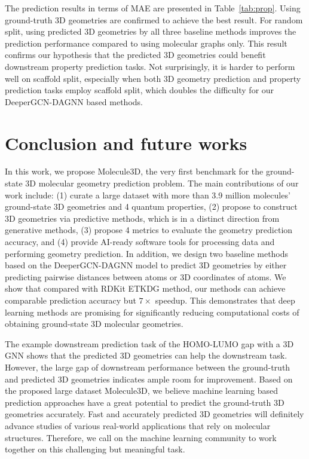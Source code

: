 \documentclass{article}
\begin{document}
The prediction results in terms of MAE are presented in Table~\ref{tab:prop}. Using ground-truth 3D geometries are confirmed to achieve the best result. For random split, using predicted 3D geometries by all three baseline methods improves the prediction performance compared to using molecular graphs only. This result confirms our hypothesis that the predicted 3D geometries could benefit downstream property prediction tasks. Not surprisingly, it is harder to perform well on scaffold split, especially when both 3D geometry prediction and property prediction tasks employ scaffold split, which doubles the difficulty for our DeeperGCN-DAGNN based methods. 


\section{Conclusion and future works}

In this work, we propose Molecule3D, the very first benchmark for the ground-state 3D molecular geometry prediction problem. The main contributions of our work include: (1) curate a large dataset with more than 3.9 million molecules' ground-state 3D geometries and 4 quantum properties, (2) propose to construct 3D geometries via predictive methods, which is in a distinct direction from generative methods, (3) propose 4 metrics to evaluate the geometry prediction accuracy, and (4) provide AI-ready software tools for processing data and performing geometry prediction. In addition, we design two baseline methods based on the DeeperGCN-DAGNN \cite{liu2021fast} model to predict 3D geometries by either predicting pairwise distances between atoms or 3D coordinates of atoms. We show that compared with RDKit ETKDG \cite{riniker2015better} method, our methods can achieve comparable prediction accuracy but $7\times$ speedup. This demonstrates that deep learning methods are promising for significantly reducing computational costs of obtaining ground-state 3D molecular geometries. 

The example downstream prediction task of the HOMO-LUMO gap with a 3D GNN shows that the predicted 3D geometries can help the downstream task. However, the large gap of downstream performance between the ground-truth and predicted 3D geometries indicates ample room for improvement. Based on the proposed large dataset Molecule3D, we believe machine learning based prediction approaches have a great potential to predict the ground-truth 3D geometries accurately. Fast and accurately predicted 3D geometries will definitely advance studies of various real-world applications that rely on molecular structures. Therefore, we call on the machine learning community to work together on this challenging but meaningful task. 
\end{document}

